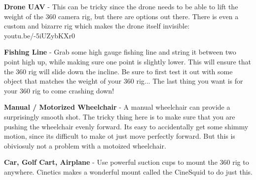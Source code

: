 \begin{fullwidth}
{\bf Drone UAV} - This can be tricky since the drone needs to be able to lift the weight of the 360 camera rig, but there are options out there. There is even a custom and bizarre rig which makes the drone itself invisible: youtu.be/-5iUZybKXr0

{\bf Fishing Line} - Grab some high gauge fishing line and string it between two point high up, while making sure one point is slightly lower. This will ensure that the 360 rig will slide down the incline. Be sure to first test it out with some object that matches the weight of your 360 rig... The last thing you want is for your 360 rig to come crashing down!

{\bf Manual / Motorized Wheelchair} - A manual wheelchair can provide a surprisingly smooth shot. The tricky thing here is to make sure that you are pushing the wheelchair evenly forward. Its easy to accidentally get some shimmy motion, since its difficult to make ot just move perfectly forward. But this is obiviosuly not a problem with a motoized wheelchair. 

{\bf Car, Golf Cart, Airplane} - Use powerful suction cups to mount the 360 rig to anywhere. Cinetics makes a wonderful mount called the CineSquid to do just this.





\clearpage
\end{fullwidth}
